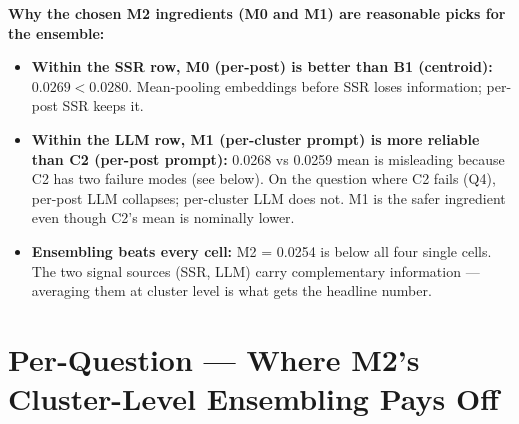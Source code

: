 \documentclass[10pt,a4paper]{article}
\begin{document}
\textbf{Why the chosen M2 ingredients (M0 and M1) are reasonable picks for the ensemble:}

\begin{itemize}[leftmargin=*,itemsep=0pt]
    \item \textbf{Within the SSR row, M0 (per-post) is better than B1 (centroid):} $0.0269 < 0.0280$. Mean-pooling embeddings before SSR loses information; per-post SSR keeps it.
    \item \textbf{Within the LLM row, M1 (per-cluster prompt) is more reliable than C2 (per-post prompt):} 0.0268 vs 0.0259 mean is misleading because C2 has two failure modes (see below). On the question where C2 fails (Q4), per-post LLM collapses; per-cluster LLM does not. M1 is the safer ingredient even though C2's mean is nominally lower.
    \item \textbf{Ensembling beats every cell:} M2 = 0.0254 is below all four single cells. The two signal sources (SSR, LLM) carry complementary information — averaging them at cluster level is what gets the headline number.
\end{itemize}

\section{Per-Question — Where M2's Cluster-Level Ensembling Pays Off}
\end{document}

